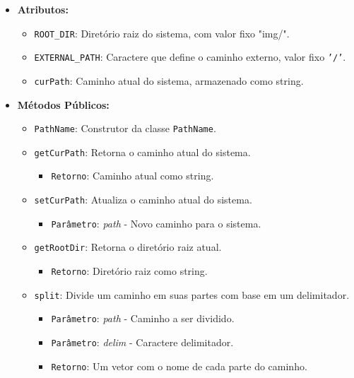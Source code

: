 \documentclass[
    12pt,				%
    oneside,   	        %
    a4paper,			%
    english,			%
    french,				%
    spanish,			%
    brazil,				%
    ]{pacotes/abntex2}
\begin{document}
\begin{itemize}
    \item \textbf{Atributos:}
        \begin{itemize}
            \item \texttt{ROOT\_DIR}: Diretório raiz do sistema, com valor fixo "img/".
            \item \texttt{EXTERNAL\_PATH}: Caractere que define o caminho externo, valor fixo \texttt{'/'}.
            \item \texttt{curPath}: Caminho atual do sistema, armazenado como string.
        \end{itemize}
    \item \textbf{Métodos Públicos:}
        \begin{itemize}
            \item \texttt{PathName}: Construtor da classe \texttt{PathName}.
            \item \texttt{getCurPath}: Retorna o caminho atual do sistema.
            \begin{itemize}
                \item \texttt{Retorno}: Caminho atual como string.
            \end{itemize}
            \item \texttt{setCurPath}: Atualiza o caminho atual do sistema.
            \begin{itemize}
                \item \texttt{Parâmetro}: \textit{path} - Novo caminho para o sistema.
            \end{itemize}
            \item \texttt{getRootDir}: Retorna o diretório raiz atual.
            \begin{itemize}
                \item \texttt{Retorno}: Diretório raiz como string.
            \end{itemize}
            \item \texttt{split}: Divide um caminho em suas partes com base em um delimitador.
            \begin{itemize}
                \item \texttt{Parâmetro}: \textit{path} - Caminho a ser dividido.
                \item \texttt{Parâmetro}: \textit{delim} - Caractere delimitador.
                \item \texttt{Retorno}: Um vetor com o nome de cada parte do caminho.
            \end{itemize}

\end{itemize}
\end{itemize}
\end{document}
